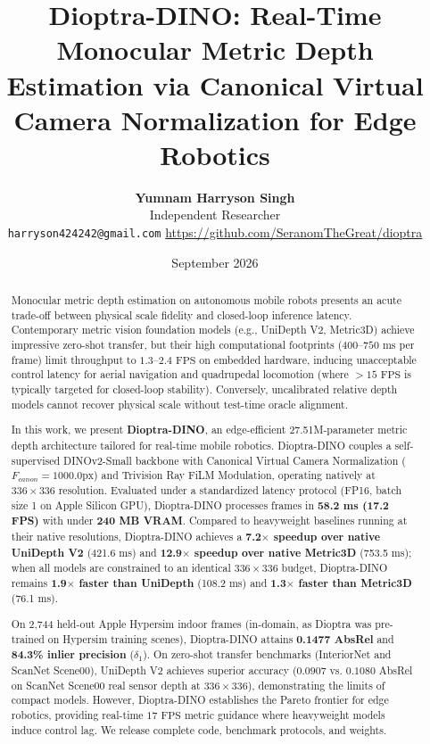 \documentclass[10pt,twocolumn,letterpaper]{article}
\title{\textbf{Dioptra-DINO: Real-Time Monocular Metric Depth Estimation via Canonical Virtual Camera Normalization for Edge Robotics}}
\author{
    \textbf{Yumnam Harryson Singh}\\[0.2em]
    Independent Researcher\\
    \small \texttt{harryson424242@gmail.com} \quad \url{https://github.com/SeranomTheGreat/dioptra}
}
\date{September 2026}
\begin{document}
\maketitle

\begin{abstract}
Monocular metric depth estimation on autonomous mobile robots presents an acute trade-off between physical scale fidelity and closed-loop inference latency. Contemporary metric vision foundation models (e.g., UniDepth V2, Metric3D) achieve impressive zero-shot transfer, but their high computational footprints ($400\text{--}750\text{ ms}$ per frame) limit throughput to $1.3\text{--}2.4\text{ FPS}$ on embedded hardware, inducing unacceptable control latency for aerial navigation and quadrupedal locomotion (where $>15\text{ FPS}$ is typically targeted for closed-loop stability). Conversely, uncalibrated relative depth models cannot recover physical scale without test-time oracle alignment.

In this work, we present \textbf{Dioptra-DINO}, an edge-efficient 27.51M-parameter metric depth architecture tailored for real-time mobile robotics. Dioptra-DINO couples a self-supervised DINOv2-Small backbone with Canonical Virtual Camera Normalization ($F_{canon} = 1000.0\text{px}$) and Trivision Ray FiLM Modulation, operating natively at $336 \times 336$ resolution. Evaluated under a standardized latency protocol (FP16, batch size 1 on Apple Silicon GPU), Dioptra-DINO processes frames in \textbf{58.2 ms (17.2 FPS)} with under \textbf{240 MB VRAM}. Compared to heavyweight baselines running at their native resolutions, Dioptra-DINO achieves a \textbf{7.2$\times$ speedup over native UniDepth V2} (421.6 ms) and \textbf{12.9$\times$ speedup over native Metric3D} (753.5 ms); when all models are constrained to an identical $336 \times 336$ budget, Dioptra-DINO remains \textbf{1.9$\times$ faster than UniDepth} (108.2 ms) and \textbf{1.3$\times$ faster than Metric3D} (76.1 ms).

On 2,744 held-out Apple Hypersim indoor frames (in-domain, as Dioptra was pre-trained on Hypersim training scenes), Dioptra-DINO attains \textbf{0.1477 AbsRel} and \textbf{84.3\% inlier precision} ($\delta_1$). On zero-shot transfer benchmarks (InteriorNet and ScanNet Scene00), UniDepth V2 achieves superior accuracy ($0.0907$ vs. $0.1080$ AbsRel on ScanNet Scene00 real sensor depth at $336 \times 336$), demonstrating the limits of compact models. However, Dioptra-DINO establishes the Pareto frontier for edge robotics, providing real-time $17\text{ FPS}$ metric guidance where heavyweight models induce control lag. We release complete code, benchmark protocols, and weights.
\end{abstract}
\end{document}
